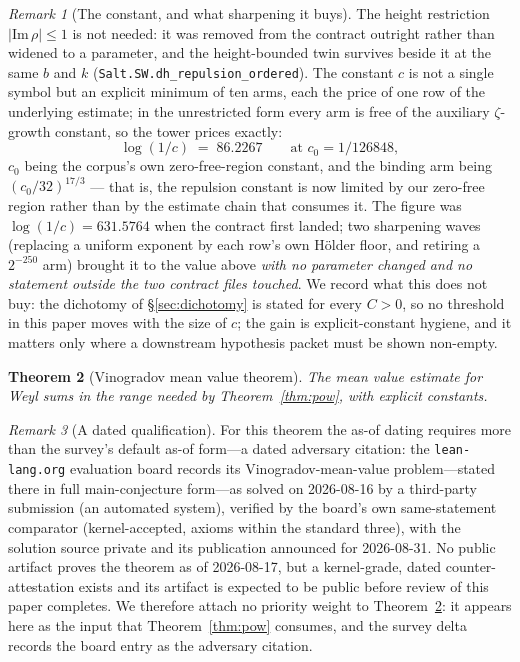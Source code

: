\documentclass{CUP-JNL-FMP}
\newcommand{\leanname}[1]{\par\noindent{\small\texttt{#1}}}
\newcommand{\leaninline}[1]{{\small\texttt{#1}}}
\newtheorem{theorem}{Theorem}[section]
\theoremstyle{remark}
\newtheorem{remark}[theorem]{Remark}
\begin{document}
\begin{remark}[The constant, and what sharpening it buys]\label{rem:repc}
The height restriction $|\mathrm{Im}\,\rho| \le 1$ is not needed: it was
removed from the contract outright rather than widened to a parameter, and
the height-bounded twin survives beside it at the same $b$ and $k$
(\leaninline{Salt.SW.dh\_repulsion\_ordered}). The constant $c$ is not a
single symbol but an explicit minimum of ten arms, each the price of one row
of the underlying estimate; in the unrestricted form every arm is free of the
auxiliary $\zeta$-growth constant, so the tower prices exactly:
\[
\log(1/c) \;=\; 86.2267 \qquad \text{at } c_0 = 1/126848,
\]
$c_0$ being the corpus's own zero-free-region constant, and the binding arm
being $(c_0/32)^{17/3}$ --- that is, the repulsion constant is now limited by
our zero-free region rather than by the estimate chain that consumes it. The
figure was $\log(1/c) = 631.5764$ when the contract first landed; two
sharpening waves (replacing a uniform exponent by each row's own H\"older
floor, and retiring a $2^{-250}$ arm) brought it to the value above
\emph{with no parameter changed and no statement outside the two contract
files touched}. We record what this does not buy: the dichotomy of
\S\ref{sec:dichotomy} is stated for every $C > 0$, so no threshold in this
paper moves with the size of $c$; the gain is explicit-constant hygiene, and
it matters only where a downstream hypothesis packet must be shown
non-empty.
\end{remark}

\begin{theorem}[Vinogradov mean value theorem]\label{thm:vmvt}
The mean value estimate for Weyl sums in the range needed by
Theorem~\ref{thm:pow}, with explicit constants.
\leanname{Salt.Vmvt.vmvt}
\end{theorem}

\begin{remark}[A dated qualification]\label{rem:vmvtdate}
For this theorem the as-of dating requires more than the survey's default
as-of form---a dated adversary citation: the \texttt{lean-lang.org}
evaluation board records its Vinogradov-mean-value problem---stated there
in full main-conjecture form---as solved on 2026-08-16 by a third-party
submission (an automated system),
verified by the board's own same-statement comparator (kernel-accepted,
axioms within the standard three), with the solution source private and its
publication announced for 2026-08-31. No public artifact proves the theorem
as of 2026-08-17, but a kernel-grade, dated counter-attestation exists and
its artifact is expected to be public before review of this paper
completes. We therefore attach no priority weight to
Theorem~\ref{thm:vmvt}: it appears here as the input that
Theorem~\ref{thm:pow} consumes, and the survey delta records the board
entry as the adversary citation.
\end{remark}
\end{document}
